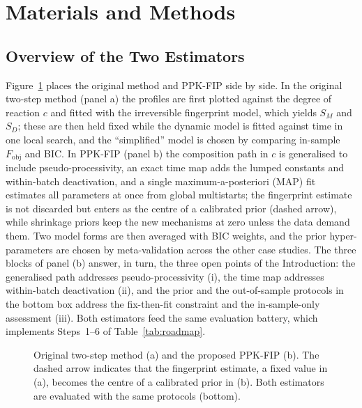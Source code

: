 \section{Materials and Methods}\label{sec:methods}
\subsection{Overview of the Two Estimators}
Figure~\ref{fig:workflow} places the original method and PPK-FIP side by side. In the original two-step method (panel a) the profiles are first plotted against the degree of reaction $c$ and fitted with the irreversible fingerprint model, which yields $S_M$ and $S_D$; these are then held fixed while the dynamic model is fitted against time in one local search, and the ``simplified'' model is chosen by comparing in-sample $F_\mathrm{obj}$ and BIC. In PPK-FIP (panel b) the composition path in $c$ is generalised to include pseudo-processivity, an exact time map adds the lumped constants and within-batch deactivation, and a single maximum-a-posteriori (MAP) fit estimates all parameters at once from global multistarts; the fingerprint estimate is not discarded but enters as the centre of a calibrated prior (dashed arrow), while shrinkage priors keep the new mechanisms at zero unless the data demand them. Two model forms are then averaged with BIC weights, and the prior hyper-parameters are chosen by meta-validation across the other case studies. The three blocks of panel (b) answer, in turn, the three open points of the Introduction: the generalised path addresses pseudo-processivity (i), the time map addresses within-batch deactivation (ii), and the prior and the out-of-sample protocols in the bottom box address the fix-then-fit constraint and the in-sample-only assessment (iii). Both estimators feed the same evaluation battery, which implements Steps~1--6 of Table~\ref{tab:roadmap}.
\begin{figure}[!htbp]\centering{}\caption{Original two-step method (a) and the proposed PPK-FIP (b). The dashed arrow indicates that the fingerprint estimate, a fixed value in (a), becomes the centre of a calibrated prior in (b). Both estimators are evaluated with the same protocols (bottom).}\label{fig:workflow}\end{figure}

